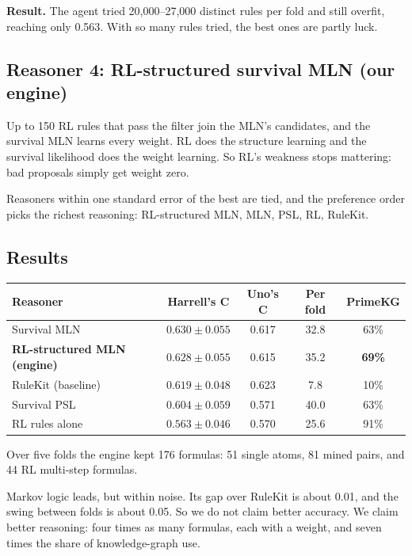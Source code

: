 \documentclass[11pt,a4paper]{article}
\begin{document}
\textbf{Result.} The agent tried 20,000--27,000 distinct rules per fold and still overfit, reaching only 0.563. With so many rules tried, the best ones are partly luck.

\subsection{Reasoner 4: RL-structured survival MLN (our engine)}
Up to 150 RL rules that pass the filter join the MLN's candidates, and the survival MLN learns every weight. RL does the structure learning and the survival likelihood does the weight learning. So RL's weakness stops mattering: bad proposals simply get weight zero.

Reasoners within one standard error of the best are tied, and the preference order picks the richest reasoning: RL-structured MLN, MLN, PSL, RL, RuleKit.

\subsection{Results}
\begin{center}
\begin{tabular}{lcccc}
\toprule
Reasoner & Harrell's C & Uno's C & Per fold & PrimeKG \\
\midrule
Survival MLN & $0.630\pm0.055$ & 0.617 & 32.8 & 63\% \\
\textbf{RL-structured MLN (engine)} & $\mathbf{0.628\pm0.055}$ & 0.615 & 35.2 & \textbf{69\%} \\
RuleKit (baseline) & $0.619\pm0.048$ & 0.623 & 7.8 & 10\% \\
Survival PSL & $0.604\pm0.059$ & 0.571 & 40.0 & 63\% \\
RL rules alone & $0.563\pm0.046$ & 0.570 & 25.6 & 91\% \\
\bottomrule
\end{tabular}
\end{center}
Over five folds the engine kept 176 formulas: 51 single atoms, 81 mined pairs, and 44 RL multi-step formulas.

\begin{saybox}
Markov logic leads, but within noise. Its gap over RuleKit is about 0.01, and the swing between folds is about 0.05. So we do not claim better accuracy. We claim better reasoning: four times as many formulas, each with a weight, and seven times the share of knowledge-graph use.
\end{saybox}
\end{document}

